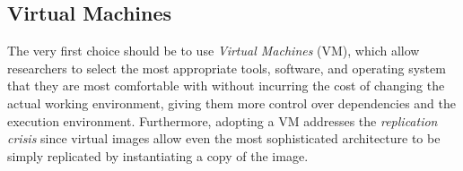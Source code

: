 




\subsection{Virtual Machines}
The very first choice should be to use \emph{Virtual Machines} (VM), which allow researchers to select the most appropriate tools, software, and operating system that they are most comfortable with without incurring the cost of changing the actual working environment, giving them more control over dependencies and the execution environment.
Furthermore, adopting a VM addresses the \emph{replication crisis} since virtual images allow even the most sophisticated architecture to be simply replicated by instantiating a copy of the image.

